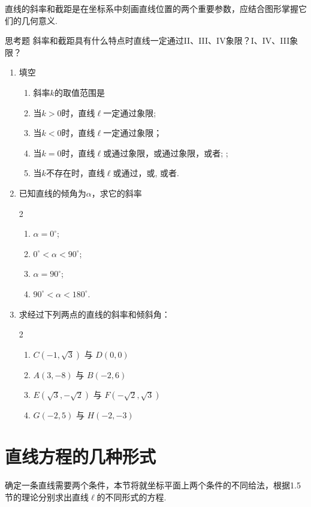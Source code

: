 直线的斜率和截距是在坐标系中刻画直线位置的两个重要参数，应结合图形掌握它们的几何意义.

\begin{thm}
    {思考题} 斜率和截距具有什么特点时直线一定通过II、III、IV象限？I、IV、III象限？
\end{thm}

\begin{ex}
\begin{enumerate}
    \item 填空
\begin{enumerate}[(1)]
    \item 斜率$k$的取值范围是\blank
    \item 当$k>0$时，直线$\ell$一定通过\blank 象限;
    \item 当$k<0$时，直线$\ell$一定通过\blank 象限；
    \item 当$k=0$时，直线$\ell$或通过\blank 象限，或通过\blank 象限，或者\blank; \blank;
    \item 当$k$不存在时，直线$\ell$或通过\blank，或\blank, 或者\blank.
\end{enumerate}

    \item 已知直线的倾角为$\alpha$，求它的斜率
\begin{multicols}{2}
\begin{enumerate}[(1)]
\item $\alpha =0^{\circ}$;
\item $0^{\circ}<\alpha <90^{\circ}$;
\item $\alpha =90^{\circ}$;
\item $90^{\circ}<\alpha <180^{\circ}$.
\end{enumerate}    
\end{multicols}
    \item 求经过下列两点的直线的斜率和倾斜角：
\begin{multicols}{2}
\begin{enumerate}[(1)]
\item $C(-1,\sqrt{3})$ 与 $D(0,0)$
\item $A(3,-8)$ 与 $B(-2,6)$
\item $E(\sqrt{3},-\sqrt{2})$ 与 $F(-\sqrt{2},\sqrt{3})$
\item $G(-2,5)$ 与 $H(-2,-3)$  
\end{enumerate}    
\end{multicols}
\end{enumerate}
\end{ex}

\section{直线方程的几种形式}
确定一条直线需要两个条件，本节将就坐标平面上两个条件的不同给法，根据1.5节的理论分别求出直线$\ell$的不同形式的方程.


